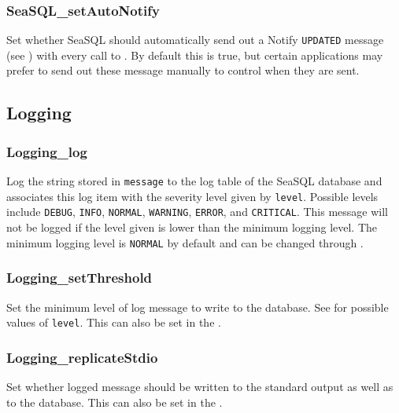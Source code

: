 \subsubsection{SeaSQL\_setAutoNotify} \label{apiseasqlnotify}
 Set whether SeaSQL should
automatically send out a Notify \texttt{UPDATED} message (see
) with every call to
. By default this is true,
but certain applications may prefer to send out these message manually to
control when they are sent.

\subsection{Logging} \label{apilogging}
\subsubsection{Logging\_log} \label{apilogginglog}
 Log the string stored in
\texttt{message} to the log table of the SeaSQL database and associates this log
item with the severity level given by \texttt{level}. Possible levels include
\texttt{DEBUG}, \texttt{INFO}, \texttt{NORMAL}, \texttt{WARNING},
\texttt{ERROR}, and \texttt{CRITICAL}. This message will not be logged if the
level given is lower than the minimum logging level. The minimum logging level
is \texttt{NORMAL} by default and can be changed through
.

\subsubsection{Logging\_setThreshold} \label{apiloggingsetthreshold}
 Set the minimum level of log
message to write to the database. See 
for possible values of \texttt{level}. This can also be set in the
. 

\subsubsection{Logging\_replicateStdio} \label{apiloggingreplicate}
 Set whether logged message
should be written to the standard output as well as to the database. This can
also be set in the .


